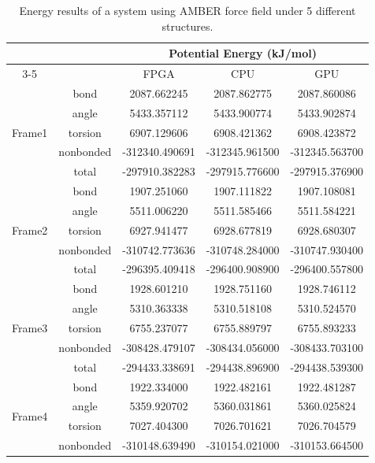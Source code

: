 \documentclass{article}
\begin{document}
\begin{table}[!ht]
	\centering
	\caption[Test system energy using AMBER force field]{Energy results of a system using AMBER force field under 5 different structures. }
	\begin{tabular}{ccccc}
		\hline
		&           & \multicolumn{3}{c}{Potential Energy (kJ/mol)}    \\ \cline{3-5} 
		&           & FPGA           & CPU            & GPU            \\ \hline
		\multirow{5}{*}{Frame1} & bond      & 2087.662245   & 2087.862775    & 2087.860086    \\
		& angle     & 5433.357112    & 5433.900774    & 5433.902874    \\
		& torsion   & 6907.129606    & 6908.421362    & 6908.423872    \\
		& nonbonded & -312340.490691 & -312345.961500 & -312345.563700 \\
		& total     & -297910.382283 & -297915.776600 & -297915.376900 \\ \hline
		\multirow{5}{*}{Frame2} & bond      & 1907.251060    & 1907.111822    & 1907.108081    \\
		& angle     & 5511.006220    & 5511.585466    & 5511.584221    \\
		& torsion   & 6927.941477    & 6928.677819    & 6928.680307    \\
		& nonbonded & -310742.773636 & -310748.284000 & -310747.930400 \\
		& total     & -296395.409418 & -296400.908900 & -296400.557800 \\ \hline
		\multirow{5}{*}{Frame3} & bond      & 1928.601210    & 1928.751160    & 1928.746112    \\
		& angle     & 5310.363338    & 5310.518108    & 5310.524570    \\
		& torsion   & 6755.237077    & 6755.889797    & 6755.893233    \\
		& nonbonded & -308428.479107 & -308434.056000 & -308433.703100 \\
		& total     & -294433.338691 & -294438.896900 & -294438.539300 \\ \hline
		\multirow{5}{*}{Frame4} & bond      & 1922.334000    & 1922.482161    & 1922.481287    \\
		& angle     & 5359.920702    & 5360.031861    & 5360.025824    \\
		& torsion   & 7027.404300    & 7026.701621    & 7026.704579    \\
		& nonbonded & -310148.639490 & -310154.021000 & -310153.664500 \\

\end{tabular}
\end{table}
\end{document}

